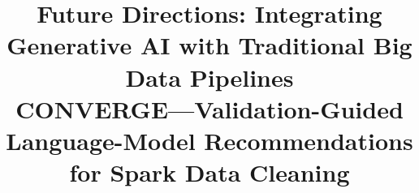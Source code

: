 \documentclass[conference,10pt]{IEEEtran}
\begin{document}
\title{Future Directions: Integrating Generative AI with Traditional Big Data Pipelines\\[2pt]
\large CONVERGE---Validation-Guided Language-Model Recommendations for Spark Data Cleaning}

\author{
}

\maketitle










\end{document}
